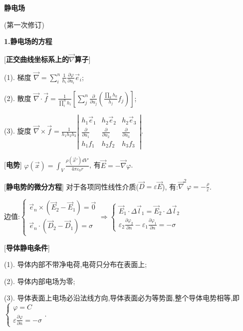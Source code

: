 


 \begin{center} 
 \Large \textbf{静电场}\par
 (第一次修订)
\end{center}
 
\large 
\begin{center}
 \textbf{1.静电场的方程}
\end{center}

[\textbf{正交曲线坐标系上的$\vec\nabla$算子}] \par
\qquad (1). 梯度 $\vec\nabla =\sum\limits_i^n\frac{1}{h_i}\frac{\partial\varphi}{\partial u_i}\vec e_i$;\par
\qquad (2). 散度 $\vec\nabla\cdot\vec f=\frac{1}{\prod\limits_i^n h_i}\left[\sum\limits_j^n\frac{\partial}{\partial u_j}\left(\frac{\prod\limits_k h_k}{h_j}f_j\right)\right]$;\par
\qquad (3). 旋度 $\vec\nabla\times\vec f=\frac{1}{h_1h_2h_3}\left|\begin{matrix}h_1\vec e_1& h_2\vec e_2& h_2\vec e_3\\ \frac{\partial}{\partial u_1}& \frac{\partial}{\partial u_2}& \frac{\partial}{\partial u_3}\\ h_1f_1& h_2f_2& h_3f_3\end{matrix}\right|$.\par
 
[\textbf{电势}] $\varphi(\vec x)=\int_V\frac{\rho(\vec x')dV'}{4\pi\varepsilon_0r}$, 有$\vec E=-\vec\nabla \varphi$.\par

[\textbf{静电势的微分方程}] 对于各项同性线性介质($\vec D=\varepsilon\vec E$), 有:$\vec\nabla^2\varphi=-\frac{\rho}{\varepsilon}$.\par
边值:$\begin{cases}
    \vec e_n\times(\vec E_2-\vec E_1)=\vec 0 \\ 
    \vec e_n\cdot(\vec D_2-\vec D_1)=\sigma
\end{cases}\Rightarrow
\begin{cases}
   \vec E_1\cdot \Delta\vec l_1=\vec E_2\cdot\Delta\vec l_2\\
   \varepsilon_2\frac{\partial\varphi_2}{\partial n}-\varepsilon_1\frac{\partial \varphi_1}{\partial n}=-\sigma
\end{cases}$\par

[\textbf{导体静电条件}] \par
\qquad (1). 导体内部不带净电荷,电荷只分布在表面上;\par
\qquad (2). 导体内部电场为零;\par
\qquad (3). 导体表面上电场必沿法线方向,导体表面必为等势面,整个导体电势相等,即$\begin{cases}\varphi =C\\\varepsilon\frac{\partial \varphi}{\partial n}=-\sigma \end{cases}$.\par

